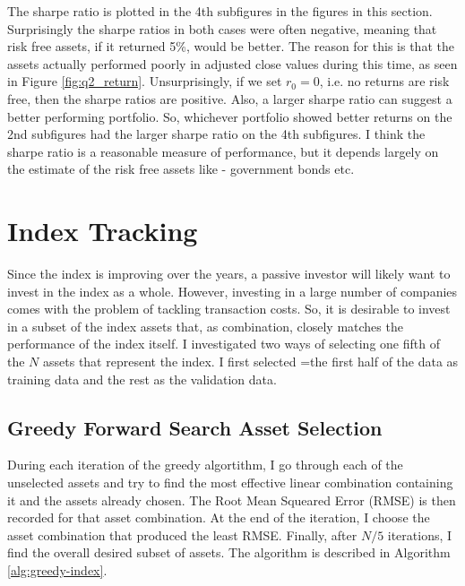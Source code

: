 \documentclass[11pt]{article}
\begin{document}
The sharpe ratio is plotted in the 4th subfigures in the figures in this section. Surprisingly the sharpe
ratios in both cases were often negative, meaning that risk free assets, if it returned 5\%, would be better.
The reason for this is that the assets actually performed poorly in adjusted close values during this
time, as seen in Figure \ref{fig:q2_return}. Unsurprisingly, if we set $r_0 = 0$, i.e. no returns are risk free,
then the sharpe ratios are positive. Also, a larger sharpe ratio can suggest a better performing portfolio. So, whichever portfolio showed
better returns on the 2nd subfigures had the larger sharpe ratio on the 4th subfigures. I think the sharpe ratio
is a reasonable measure of performance, but it depends largely on the estimate of the risk free assets like -
government bonds etc.

\section{Index Tracking}

Since the index is improving over the years, a passive investor will likely want to invest in the index as a whole.
However, investing in a large number of companies comes with the problem of tackling transaction costs. So, it is
desirable to invest in a subset of the index assets that, as combination, closely matches the performance of the index
itself. I investigated two ways of selecting one fifth of the $N$ assets that represent the index. I first selected
 =the first half of the data as training data and the rest as the validation data.

\subsection{Greedy Forward Search Asset Selection}

During each iteration of the greedy algortithm, I go through each of the unselected assets and try to find the most
effective linear combination containing it and the assets already chosen. The Root Mean Squeared Error (RMSE) is then
recorded for that asset combination. At the end of the iteration, I choose the asset combination that produced the 
least RMSE. Finally, after $N/5$ iterations, I find the overall desired subset of assets. The algorithm is described in
Algorithm \ref{alg:greedy-index}.
\end{document}
